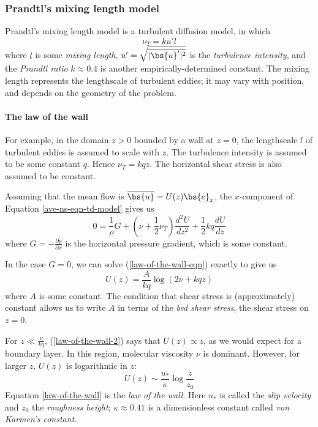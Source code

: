\subsubsection{Prandtl's mixing length model}

Prandtl's mixing length model is a turbulent diffusion model, in which
\begin{equation}
    \nu_T = k u' l
\end{equation}
where $l$ is some \textit{mixing length}, $u'=\sqrt{\overline{|\bs{u}'|^2}}$
is the \textit{turbulence intensity}, and the \textit{Prandtl ratio}
$k\approx0.4$ is another empirically-determined constant. The mixing length
represents the lengthscale of turbulent eddies; it may vary with position, and
depends on the geometry of the problem. 

\paragraph{The law of the wall} For example, in the domain $z>0$ bounded by a
wall at $z=0$, the lengthscale $l$ of turbulent eddies is assumed to scale with
$z$. The turbulence intensity is assumed to be some constant $q$. Hence $\nu_T =
kqz$.  The horizontal shear stress is also assumed to be constant. 

Assuming that the mean flow is $\overline{\bs{u}} = U(z) \bs{e}_x$, the
$x$-component of Equation \ref{ave-ns-eqn-td-model} gives us
\begin{equation}
    0 = \frac{1}{\rho} G
    + \left(\nu+\frac{1}{2}\nu_T\right)\frac{d^2U}{dz^2}
    + \frac{1}{2}kq \frac{dU}{dz}
    \label{law-of-the-wall-eqn}
\end{equation}
where $G = -\frac{\partial\overline{p}}{\partial x}$ is the horizontal pressure
gradient, which is some constant. 

In the case $G=0$, we can solve (\ref{law-of-the-wall-eqn}) exactly to give us
\begin{equation}
    U(z) = \frac{A}{kq} \log(2\nu + kqz)
    \label{law-of-the-wall-2}
\end{equation}
where $A$ is some constant. The condition that shear stress is (approximately)
constant allows us to write $A$ in terms of the \textit{bed shear stress}, the
shear stress on $z=0$.

For $z\ll\frac{\nu}{kq}$, (\ref{law-of-the-wall-2}) says that $U(z)\propto z$,
as we would expect for a boundary layer. In this region, molecular viscosity
$\nu$ is dominant. However, for larger $z$, $U(z)$ is logarithmic in $z$:
\begin{equation}
\boxed{
    U(z) \sim \frac{u_*}{\kappa} \log\frac{z}{z_0}
    \label{law-of-the-wall}
}
\end{equation}
Equation \ref{law-of-the-wall} is the \textit{law of the wall}. Here $u_*$ is called the \textit{slip velocity} and $z_0$ the \textit{roughness height}; $\kappa\approx0.41$ is a dimensionless constant called \textit{von Karmen's constant}. 

